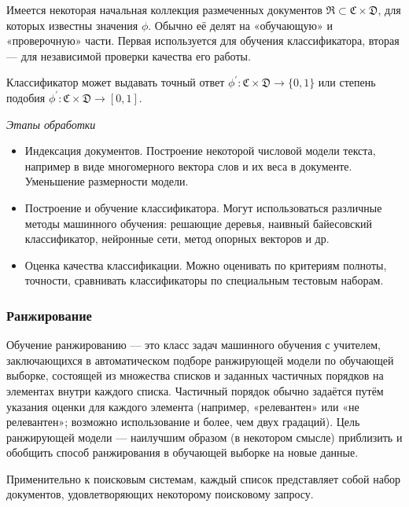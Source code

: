 Имеется некоторая начальная коллекция размеченных документов $\mathfrak{R} \subset \mathfrak{C} \times \mathfrak{D}$, для которых известны значения $\phi$. Обычно её делят на «обучающую» и «проверочную» части. Первая используется для обучения классификатора, вторая — для независимой проверки качества его работы.

Классификатор может выдавать точный ответ $\phi^\prime\colon \mathfrak{C} \times \mathfrak{D} \rightarrow \{ 0, 1 \}$ или степень подобия $\phi^\prime\colon \mathfrak{C} \times \mathfrak{D} \rightarrow [ 0, 1 ]$.

\emph{Этапы обработки}

\begin{itemize}

  \item Индексация документов. Построение некоторой числовой модели текста, например в виде многомерного вектора слов и их веса в документе. Уменьшение размерности модели.

  \item Построение и обучение классификатора. Могут использоваться различные методы машинного обучения: решающие деревья, наивный байесовский классификатор, нейронные сети, метод опорных векторов и др.

  \item Оценка качества классификации. Можно оценивать по критериям полноты, точности, сравнивать классификаторы по специальным тестовым наборам. 
\end{itemize}

\subsubsection{Ранжирование}

Обучение ранжированию — это класс задач машинного обучения с учителем, заключающихся в автоматическом подборе ранжирующей модели по обучающей выборке, состоящей из множества списков и заданных частичных порядков на элементах внутри каждого списка. Частичный порядок обычно задаётся путём указания оценки для каждого элемента (например, «релевантен» или «не релевантен»; возможно использование и более, чем двух градаций). Цель ранжирующей модели — наилучшим образом (в некотором смысле) приблизить и обобщить способ ранжирования в обучающей выборке на новые данные.

Применительно к поисковым системам, каждый список представляет собой набор документов, удовлетворяющих некоторому поисковому запросу.

